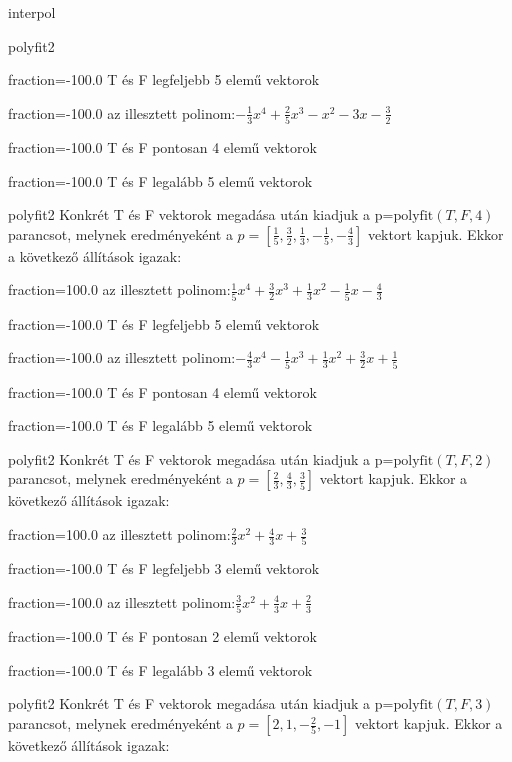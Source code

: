 \documentclass[12pt]{article}
\begin{document}
\begin{quiz}{interpol}
\begin{multi}[multiple]{polyfit2}
\item[fraction=-100.0]  T és F legfeljebb 5 elemű vektorok
\item[fraction=-100.0]  az illesztett polinom:$-\frac{1}{3}x^4+\frac{2}{5}x^3-x^2-3x-\frac{3}{2}$
\item[fraction=-100.0]  T és F pontosan 4 elemű vektorok
\item[fraction=-100.0] T és F legalább 5 elemű vektorok
\end{multi}
\begin{multi}[multiple]{polyfit2}
Konkrét T és F vektorok megadása után kiadjuk a p=$\mathrm{polyfit}(T,F,4)$
parancsot, melynek eredményeként a $p=\left[\frac{1}{5},\frac{3}{2},\frac{1}{3},-\frac{1}{5},-\frac{4}{3}\right]$ vektort kapjuk.
Ekkor a következő állítások igazak:
\item[fraction=100.0] az illesztett polinom:$\frac{1}{5}x^4+\frac{3}{2}x^3+\frac{1}{3}x^2-\frac{1}{5}x-\frac{4}{3}$
\item[fraction=-100.0]  T és F legfeljebb 5 elemű vektorok
\item[fraction=-100.0]  az illesztett polinom:$-\frac{4}{3}x^4-\frac{1}{5}x^3+\frac{1}{3}x^2+\frac{3}{2}x+\frac{1}{5}$
\item[fraction=-100.0]  T és F pontosan 4 elemű vektorok
\item[fraction=-100.0] T és F legalább 5 elemű vektorok
\end{multi}
\begin{multi}[multiple]{polyfit2}
Konkrét T és F vektorok megadása után kiadjuk a p=$\mathrm{polyfit}(T,F,2)$
parancsot, melynek eredményeként a $p=\left[\frac{2}{3},\frac{4}{3},\frac{3}{5}\right]$ vektort kapjuk.
Ekkor a következő állítások igazak:
\item[fraction=100.0] az illesztett polinom:$\frac{2}{3}x^2+\frac{4}{3}x+\frac{3}{5}$
\item[fraction=-100.0]  T és F legfeljebb 3 elemű vektorok
\item[fraction=-100.0]  az illesztett polinom:$\frac{3}{5}x^2+\frac{4}{3}x+\frac{2}{3}$
\item[fraction=-100.0]  T és F pontosan 2 elemű vektorok
\item[fraction=-100.0] T és F legalább 3 elemű vektorok
\end{multi}
\begin{multi}[multiple]{polyfit2}
Konkrét T és F vektorok megadása után kiadjuk a p=$\mathrm{polyfit}(T,F,3)$
parancsot, melynek eredményeként a $p=\left[2,1,-\frac{2}{5},-1\right]$ vektort kapjuk.
Ekkor a következő állítások igazak:

\end{multi}
\end{quiz}
\end{document}
